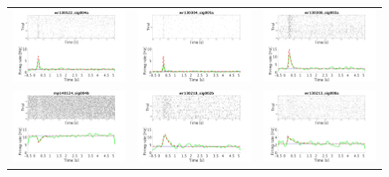 \documentclass{apa}
\begin{document}
\begin{figure}

\begin{tabular}{l l l}
\includegraphics[width =.33\textwidth]{Supplemental_Cells/allcell_138_v_11.jpeg} %
&
\includegraphics[width =.33\textwidth]{Supplemental_Cells/allcell_92_v_11.jpeg} %
&
\includegraphics[width =.33\textwidth]{Supplemental_Cells/allcell_101_v_11.jpeg}\\%


\includegraphics[width =.33\textwidth]{Supplemental_Cells/allcell_292_v_11.jpeg}%
&
\includegraphics[width =.33\textwidth]{Supplemental_Cells/allcell_35_v_11.jpeg}%
&
\includegraphics[width =.33\textwidth]{Supplemental_Cells/allcell_17_v_11.jpeg}\\ %



\end{tabular}
\end{figure}
\end{document}
